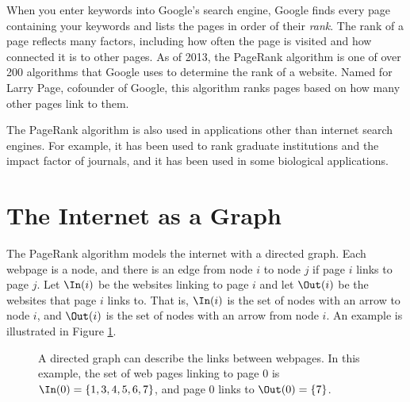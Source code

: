 \label{lab:PageRank}

When you enter keywords into Google's search engine, Google finds every page containing your keywords and lists the pages in order of their \emph{rank}.
The rank of a page reflects many factors, including how often the page is visited and how connected it is to other pages.
As of 2013, the PageRank algorithm is one of over 200 algorithms that Google uses to determine the rank of a website.
Named for Larry Page, cofounder of Google, this algorithm ranks pages based on how many other pages link to them.

The PageRank algorithm is also used in applications other than internet search engines.
For example, it has been used to rank graduate institutions and the impact factor of journals, and it has been used in some biological applications.

\section*{The Internet as a Graph}
The PageRank algorithm models the internet with a directed graph. 
Each webpage is a node, and there is an edge from node $i$ to node $j$ if page $i$ links to page $j$.
Let $\In(i)$ be the websites linking to page $i$ and let $\Out(i)$ be the websites that page $i$ links to. 
That is, $\In(i)$ is the set of nodes with an arrow to node $i$, and $\Out(i)$ is the set of nodes with an arrow from node $i$.
An example is illustrated in Figure \ref{fig:network1}.

\begin{figure}
\centering
{}

\caption{A directed graph can describe the links between webpages. In this example, the set of web pages linking to page 0 is $\In(0)=\{1,3,4,5,6,7\}$, and page 0 links to $\Out(0)=\{7\}$.}
\label{fig:network1}
\end{figure}

